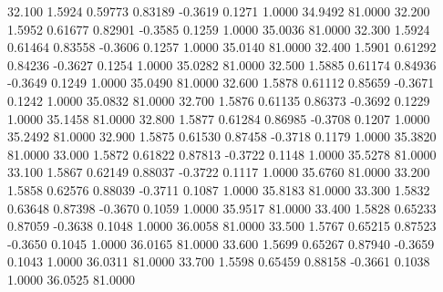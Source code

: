   32.100   1.5924   0.59773   0.83189  -0.3619   0.1271   1.0000  34.9492  81.0000
  32.200   1.5952   0.61677   0.82901  -0.3585   0.1259   1.0000  35.0036  81.0000
  32.300   1.5924   0.61464   0.83558  -0.3606   0.1257   1.0000  35.0140  81.0000
  32.400   1.5901   0.61292   0.84236  -0.3627   0.1254   1.0000  35.0282  81.0000
  32.500   1.5885   0.61174   0.84936  -0.3649   0.1249   1.0000  35.0490  81.0000
  32.600   1.5878   0.61112   0.85659  -0.3671   0.1242   1.0000  35.0832  81.0000
  32.700   1.5876   0.61135   0.86373  -0.3692   0.1229   1.0000  35.1458  81.0000
  32.800   1.5877   0.61284   0.86985  -0.3708   0.1207   1.0000  35.2492  81.0000
  32.900   1.5875   0.61530   0.87458  -0.3718   0.1179   1.0000  35.3820  81.0000
  33.000   1.5872   0.61822   0.87813  -0.3722   0.1148   1.0000  35.5278  81.0000
  33.100   1.5867   0.62149   0.88037  -0.3722   0.1117   1.0000  35.6760  81.0000
  33.200   1.5858   0.62576   0.88039  -0.3711   0.1087   1.0000  35.8183  81.0000
  33.300   1.5832   0.63648   0.87398  -0.3670   0.1059   1.0000  35.9517  81.0000
  33.400   1.5828   0.65233   0.87059  -0.3638   0.1048   1.0000  36.0058  81.0000
  33.500   1.5767   0.65215   0.87523  -0.3650   0.1045   1.0000  36.0165  81.0000
  33.600   1.5699   0.65267   0.87940  -0.3659   0.1043   1.0000  36.0311  81.0000
  33.700   1.5598   0.65459   0.88158  -0.3661   0.1038   1.0000  36.0525  81.0000
